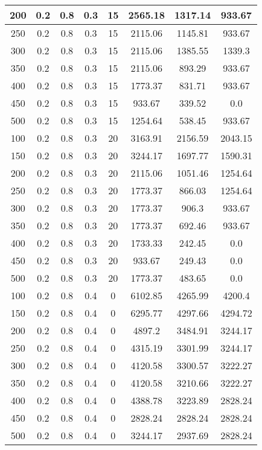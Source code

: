 \documentclass[a4paper, 12pt]{extreport}
\begin{document}
\begin{itemize}
\begin{longtable}{|c|c|c|c|c|c|c|c|}
			200 & 0.2 & 0.8 & 0.3 & 15 & 2565.18 & 1317.14 & 933.67 \\\hline
			250 & 0.2 & 0.8 & 0.3 & 15 & 2115.06 & 1145.81 & 933.67 \\\hline
			300 & 0.2 & 0.8 & 0.3 & 15 & 2115.06 & 1385.55 & 1339.3 \\\hline
			350 & 0.2 & 0.8 & 0.3 & 15 & 2115.06 & 893.29 & 933.67 \\\hline
			400 & 0.2 & 0.8 & 0.3 & 15 & 1773.37 & 831.71 & 933.67 \\\hline
			450 & 0.2 & 0.8 & 0.3 & 15 & 933.67 & 339.52 & 0.0 \\\hline
			500 & 0.2 & 0.8 & 0.3 & 15 & 1254.64 & 538.45 & 933.67 \\\hline
			100 & 0.2 & 0.8 & 0.3 & 20 & 3163.91 & 2156.59 & 2043.15 \\\hline
			150 & 0.2 & 0.8 & 0.3 & 20 & 3244.17 & 1697.77 & 1590.31 \\\hline
			200 & 0.2 & 0.8 & 0.3 & 20 & 2115.06 & 1051.46 & 1254.64 \\\hline
			250 & 0.2 & 0.8 & 0.3 & 20 & 1773.37 & 866.03 & 1254.64 \\\hline
			300 & 0.2 & 0.8 & 0.3 & 20 & 1773.37 & 906.3 & 933.67 \\\hline
			350 & 0.2 & 0.8 & 0.3 & 20 & 1773.37 & 692.46 & 933.67 \\\hline
			400 & 0.2 & 0.8 & 0.3 & 20 & 1733.33 & 242.45 & 0.0 \\\hline
			450 & 0.2 & 0.8 & 0.3 & 20 & 933.67 & 249.43 & 0.0 \\\hline
			500 & 0.2 & 0.8 & 0.3 & 20 & 1773.37 & 483.65 & 0.0 \\\hline
			100 & 0.2 & 0.8 & 0.4 & 0 & 6102.85 & 4265.99 & 4200.4 \\\hline
			150 & 0.2 & 0.8 & 0.4 & 0 & 6295.77 & 4297.66 & 4294.72 \\\hline
			200 & 0.2 & 0.8 & 0.4 & 0 & 4897.2 & 3484.91 & 3244.17 \\\hline
			250 & 0.2 & 0.8 & 0.4 & 0 & 4315.19 & 3301.99 & 3244.17 \\\hline
			300 & 0.2 & 0.8 & 0.4 & 0 & 4120.58 & 3300.57 & 3222.27 \\\hline
			350 & 0.2 & 0.8 & 0.4 & 0 & 4120.58 & 3210.66 & 3222.27 \\\hline
			400 & 0.2 & 0.8 & 0.4 & 0 & 4388.78 & 3223.89 & 2828.24 \\\hline
			450 & 0.2 & 0.8 & 0.4 & 0 & 2828.24 & 2828.24 & 2828.24 \\\hline
			500 & 0.2 & 0.8 & 0.4 & 0 & 3244.17 & 2937.69 & 2828.24 \\\hline

\end{longtable}
\end{itemize}
\end{document}
